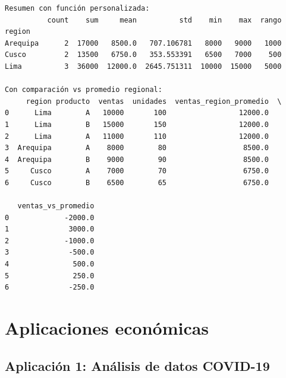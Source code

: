 \documentclass[
  doc,
  floatsintext,
  longtable,
  a4paper,
  nolmodern,
  notxfonts,
  notimes,
  12pt,
  colorlinks=true,linkcolor=blue,citecolor=blue,urlcolor=blue]{apa7}
\begin{document}
\begin{verbatim}
Resumen con función personalizada:
          count    sum     mean          std    min    max  rango
region                                                           
Arequipa      2  17000   8500.0   707.106781   8000   9000   1000
Cusco         2  13500   6750.0   353.553391   6500   7000    500
Lima          3  36000  12000.0  2645.751311  10000  15000   5000

Con comparación vs promedio regional:
     region producto  ventas  unidades  ventas_region_promedio  \
0      Lima        A   10000       100                 12000.0   
1      Lima        B   15000       150                 12000.0   
2      Lima        A   11000       110                 12000.0   
3  Arequipa        A    8000        80                  8500.0   
4  Arequipa        B    9000        90                  8500.0   
5     Cusco        A    7000        70                  6750.0   
6     Cusco        B    6500        65                  6750.0   

   ventas_vs_promedio  
0             -2000.0  
1              3000.0  
2             -1000.0  
3              -500.0  
4               500.0  
5               250.0  
6              -250.0  
\end{verbatim}

\section{Aplicaciones económicas}\label{aplicaciones-econuxf3micas-1}

\subsection{Aplicación 1: Análisis de datos
COVID-19}\label{aplicaciuxf3n-1-anuxe1lisis-de-datos-covid-19}
\end{document}
